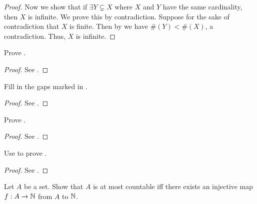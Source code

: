 \begin{proof}
  Now we show that if \(\exists Y \subsetneq X\) where \(X\) and \(Y\) have the same cardinality, then \(X\) is infinite.
  We prove this by contradiction.
  Suppose for the sake of contradiction that \(X\) is finite.
  Then by  we have \(\#(Y) < \#(X)\), a contradiction.
  Thus, \(X\) is infinite.
\end{proof}

\begin{ex}\label{i:ex:8.1.2}
  Prove .
\end{ex}

\begin{proof}
  See .
\end{proof}

\begin{ex}\label{i:ex:8.1.3}
  Fill in the gaps marked in .
\end{ex}

\begin{proof}
  See .
\end{proof}

\begin{ex}\label{i:ex:8.1.4}
  Prove .
\end{ex}

\begin{proof}
  See .
\end{proof}

\begin{ex}\label{i:ex:8.1.5}
  Use  to prove .
\end{ex}

\begin{proof}
  See .
\end{proof}

\begin{ex}\label{i:ex:8.1.6}
  Let \(A\) be a set.
  Show that \(A\) is at most countable iff there exists an injective map \(f : A \to \mathbb{N}\) from \(A\) to \(\mathbb{N}\).
\end{ex}

